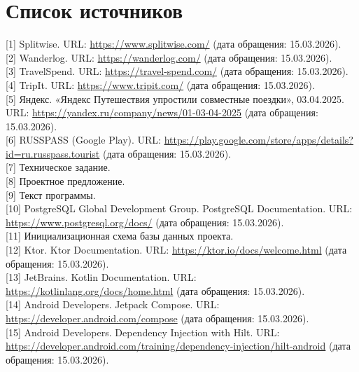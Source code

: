 \section*{Список источников}

\noindent \hypertarget{src:1}{}[1] Splitwise. URL: \url{https://www.splitwise.com/} (дата обращения: 15.03.2026).\\
\noindent \hypertarget{src:2}{}[2] Wanderlog. URL: \url{https://wanderlog.com/} (дата обращения: 15.03.2026).\\
\noindent \hypertarget{src:3}{}[3] TravelSpend. URL: \url{https://travel-spend.com/} (дата обращения: 15.03.2026).\\
\noindent \hypertarget{src:4}{}[4] TripIt. URL: \url{https://www.tripit.com/} (дата обращения: 15.03.2026).\\
\noindent \hypertarget{src:5}{}[5] Яндекс. «Яндекс Путешествия упростили совместные поездки», 03.04.2025. URL: \url{https://yandex.ru/company/news/01-03-04-2025} (дата обращения: 15.03.2026).\\
\noindent \hypertarget{src:6}{}[6] RUSSPASS (Google Play). URL: \url{https://play.google.com/store/apps/details?id=ru.russpass.tourist} (дата обращения: 15.03.2026).\\
\noindent \hypertarget{src:7}{}[7] Техническое задание.\\
\noindent \hypertarget{src:8}{}[8] Проектное предложение.\\
\noindent \hypertarget{src:9}{}[9] Текст программы.\\
\noindent \hypertarget{src:10}{}[10] PostgreSQL Global Development Group. PostgreSQL Documentation. URL: \url{https://www.postgresql.org/docs/} (дата обращения: 15.03.2026).\\
\noindent \hypertarget{src:11}{}[11] Инициализационная схема базы данных проекта.\\
\noindent \hypertarget{src:12}{}[12] Ktor. Ktor Documentation. URL: \url{https://ktor.io/docs/welcome.html} (дата обращения: 15.03.2026).\\
\noindent \hypertarget{src:13}{}[13] JetBrains. Kotlin Documentation. URL: \url{https://kotlinlang.org/docs/home.html} (дата обращения: 15.03.2026).\\
\noindent \hypertarget{src:14}{}[14] Android Developers. Jetpack Compose. URL: \url{https://developer.android.com/compose} (дата обращения: 15.03.2026).\\
\noindent \hypertarget{src:15}{}[15] Android Developers. Dependency Injection with Hilt. URL: \url{https://developer.android.com/training/dependency-injection/hilt-android} (дата обращения: 15.03.2026).\\

